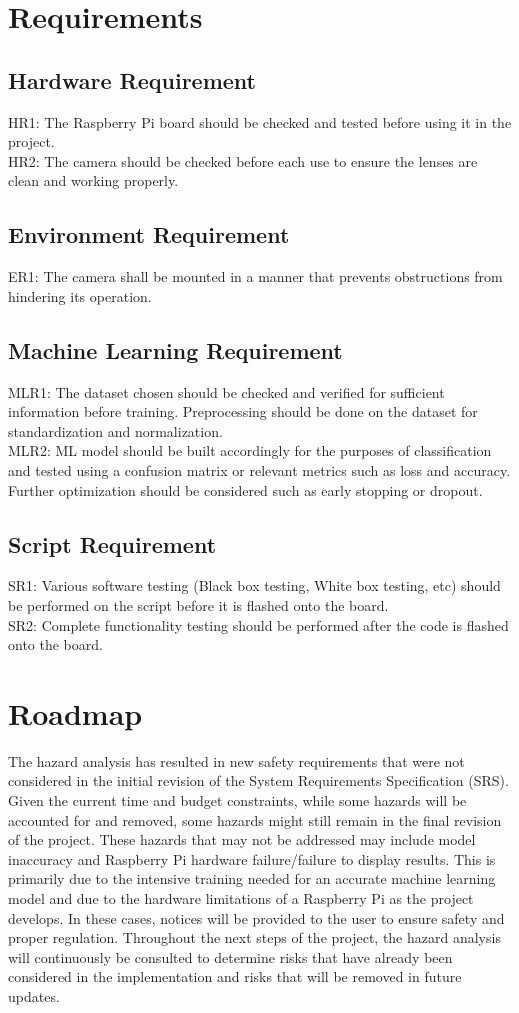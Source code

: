 \documentclass{article}
\begin{document}
\section{Requirements}
\subsection{Hardware Requirement}
HR1: The Raspberry Pi board should be checked and tested before using it in the project.\\
HR2: The camera should be checked before each use to ensure the lenses are clean and working properly.
\subsection{Environment Requirement}
ER1: The camera shall be mounted in a manner that prevents obstructions from hindering its operation.
\subsection{Machine Learning Requirement}
MLR1: The dataset chosen should be checked and verified for sufficient information before training. Preprocessing should be done on the dataset for standardization and normalization.\\
MLR2: ML model should be built accordingly for the purposes of classification and tested using a confusion matrix or relevant metrics such as loss and accuracy. Further optimization should be considered such as early stopping or dropout.
\subsection{Script Requirement}
SR1: Various software testing (Black box testing, White box testing, etc) should be performed on the script before it is flashed onto the board.\\
SR2: Complete functionality testing should be performed after the code is flashed onto the board.

\section{Roadmap}
The hazard analysis has resulted in new safety requirements that were not considered in the initial revision of the 
System Requirements Specification (SRS). Given the current time and budget constraints, while some hazards will be accounted 
for and removed, some hazards might still remain in the final revision of the project. These hazards that may not be addressed may include
model inaccuracy and Raspberry Pi hardware failure/failure to display results. This is primarily due to the intensive training needed
for an accurate machine learning model and due to the hardware limitations of a Raspberry Pi as the project develops. In these cases, notices 
will be provided to the user to ensure safety and proper regulation. Throughout the next steps of the project, the hazard analysis will continuously 
be consulted to determine risks that have already been considered in the implementation and risks that will be removed in future updates.
\end{document}

